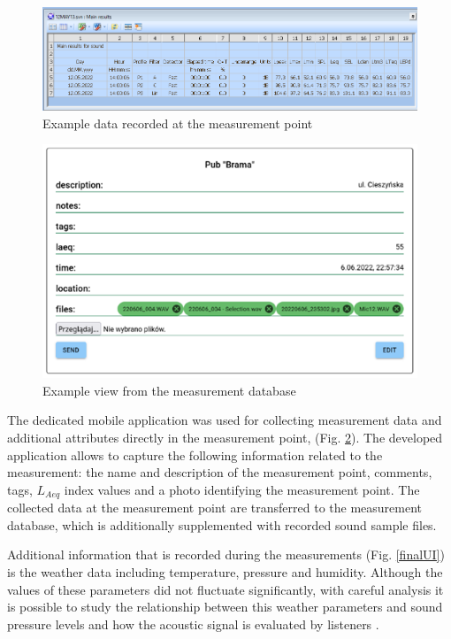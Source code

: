 \documentclass[a4paper,10pt]{article}
\begin{document}
\begin{figure}[H]
  \includegraphics[scale=.5]{fig2.png}
  \centering
  \caption{Example data recorded at the measurement point}
  \label{exampleData}
\end{figure}

\begin{figure}[H]
  \includegraphics[scale=.9]{fig3.png}
  \centering
  \caption{Example view from the measurement database}
  \label{exampleView}
\end{figure}

\begin{multicols}{2}

  The dedicated mobile application was used for collecting measurement data and
  additional attributes directly in the measurement point, (Fig.
  \ref{exampleView}). The developed application allows to capture the following
  information related to the measurement: the name and description of the
  measurement point, comments, tags, $L_{Aeq}$ index values and a photo
  identifying the measurement point. The collected data at the measurement point
  are transferred to the measurement database, which is additionally
  supplemented with recorded sound sample files.

  Additional information that is recorded during the measurements (Fig. \ref{finalUI}) is
  the weather data including temperature, pressure and humidity. Although the
  values of these parameters did not fluctuate significantly, with careful
  analysis it is possible to study the relationship between this weather
  parameters and sound pressure levels and how the acoustic signal is evaluated
  by listeners \cite{Neibo:2013}.

\end{multicols}
\end{document}
